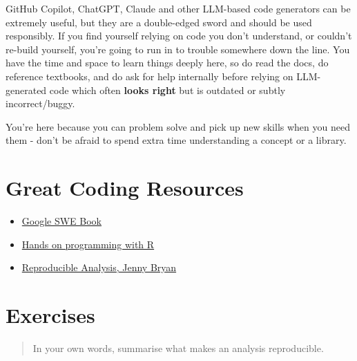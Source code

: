 \documentclass[
  letterpaper,
  DIV=11,
  numbers=noendperiod]{scrreprt}
\providecommand{\tightlist}{%
  \setlength{\itemsep}{0pt}\setlength{\parskip}{0pt}}\usepackage{longtable,booktabs,array}
\begin{document}
GitHub Copilot, ChatGPT, Claude and other LLM-based code generators can
be extremely useful, but they are a double-edged sword and should be
used responsibly. If you find yourself relying on code you don't
understand, or couldn't re-build yourself, you're going to run in to
trouble somewhere down the line. You have the time and space to learn
things deeply here, so do read the docs, do reference textbooks, and do
ask for help internally before relying on LLM-generated code which often
\textbf{looks right} but is outdated or subtly incorrect/buggy.

\begin{tcolorbox}[enhanced jigsaw, opacitybacktitle=0.6, breakable, title=\textcolor{quarto-callout-tip-color}{\faLightbulb}\hspace{0.5em}{Tip}, arc=.35mm, colframe=quarto-callout-tip-color-frame, colbacktitle=quarto-callout-tip-color!10!white, left=2mm, bottomrule=.15mm, opacityback=0, toprule=.15mm, bottomtitle=1mm, toptitle=1mm, titlerule=0mm, leftrule=.75mm, colback=white, rightrule=.15mm, coltitle=black]

You're here because you can problem solve and pick up new skills when
you need them - don't be afraid to spend extra time understanding a
concept or a library.

\end{tcolorbox}

\section{Great Coding Resources}\label{great-coding-resources}

\begin{itemize}
\tightlist
\item
  \href{https://abseil.io/resources/swe-book}{Google SWE Book}
\item
  \href{https://rstudio-education.github.io/hopr/}{Hands on programming
  with R}
\item
  \href{https://jennhuck.github.io/workshops/repro_analysis_R_RStudio.html}{Reproducible
  Analysis, Jenny Bryan}
\end{itemize}

\section{Exercises}\label{exercises-1}

\begin{quote}
In your own words, summarise what makes an analysis reproducible.
\end{quote}
\end{document}
